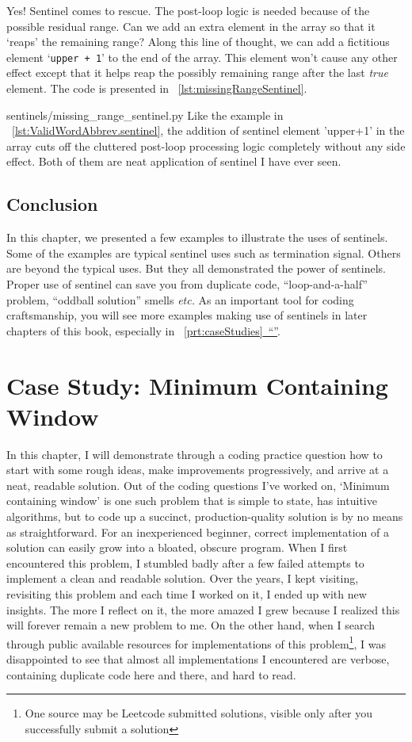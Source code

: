 \documentclass[oneside,11pt]{book}
\theoremstyle{definition}
\theoremstyle{remark}
\newcommand{\code}[1]{\mbox{\lstinline{#1}}}
\newcommand*{\fullref}[1]{\hyperref[{#1}]{\mbox{\autoref*{#1}~}``\nameref*{#1}''}}
\begin{document}
Yes!
Sentinel comes to rescue.
The post-loop logic is needed because of the possible residual range.
Can we add an extra element in the array so that it `reaps' the remaining range?
Along this line of thought, we can add a fictitious element `\code{upper + 1}' to the end of the
array.
This element won't cause any other effect except that it helps reap the possibly remaining range
after the last \emph{true} element.
The code is presented in ~\autoref{lst:missingRangeSentinel}.

{sentinels/missing_range_sentinel.py}
Like the example in ~\autoref{lst:ValidWordAbbrev.sentinel},
the addition of sentinel element 'upper+1' in the array cuts off the cluttered
post-loop processing logic completely without any side effect.
Both of them are neat application of sentinel I have ever seen.

\section{Conclusion}

In this chapter, we presented a few examples to illustrate the uses of sentinels.
Some of the examples are typical sentinel uses such as termination signal.
Others are beyond the typical uses.
But they all demonstrated the power of sentinels.
Proper use of sentinel can save you from duplicate code, ``loop-and-a-half'' problem,
``oddball solution'' smells \textit{etc.}
As an important tool for coding craftsmanship, you will see more examples making use of
sentinels in later chapters of this book, especially in ~\fullref{prt:caseStudies}.
\clearpage{}
    \clearpage{}

\chapter{Case Study: Minimum Containing Window}\label{ch:minimumContainingWindow}

In this chapter, I will demonstrate through a coding practice question
how to start with some rough ideas, make improvements progressively, and arrive at a neat, readable
solution.
Out of the coding questions I've worked on, `Minimum containing window' is one such problem
that is simple to state, has intuitive algorithms, but
to code up a succinct, production-quality solution is by no means as straightforward.
For an inexperienced beginner, correct implementation of a solution can easily grow into a bloated,
obscure program.
When I first encountered this problem, I stumbled badly after a few failed attempts to
implement a clean and readable solution.
Over the years, I kept visiting, revisiting this problem and each time I worked on it, I ended up
with new insights.
The more I reflect on it, the more amazed I grew because I realized this will forever remain a
new problem to me.
On the other hand, when I search through public available resources for implementations of this
problem\footnote{One source may be Leetcode submitted solutions, visible only after you
successfully submit a solution}, I was disappointed to see that almost all
implementations I encountered are verbose, containing duplicate code here and there, and hard to
read.
\end{document}

